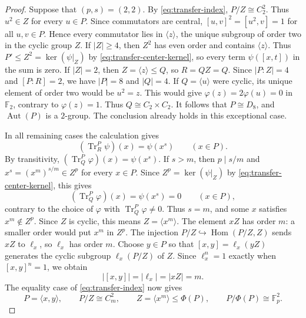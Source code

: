 \documentclass[11pt,a4paper]{article}
\theoremstyle{definition}
\theoremstyle{remark}
\numberwithin{equation}{section}
\newcommand{\Fp}{\mathbb{F}_p}
\DeclareMathOperator{\Aut}{Aut}
\DeclareMathOperator{\Hom}{Hom}
\begin{document}
\begin{proof}
		Suppose that $(p,s)=(2,2)$.
		By \eqref{eq:transfer-index}, $P/Z\cong C_2^2$.
		Thus $u^2\in Z$ for every $u\in P$. Since commutators are central,
		$[u,v]^2=[u^2,v]=1$ for all $u,v\in P$. Hence every commutator lies in
		$\langle z\rangle$, the unique subgroup of order two in the cyclic group $Z$.
		If $|Z|\ge4$, then $Z^2$ has even order and contains $\langle z\rangle$.
		Thus $P'\le Z^2=\ker(\psi|_Z)$ by \eqref{eq:transfer-center-kernel},
		so every term $\psi([x,t])$ in the sum is zero.
		If $|Z|=2$, then $Z=\langle z\rangle\le Q$, so $R=QZ=Q$.
		Since $|P:Z|=4$ and $[P:R]=2$, we have $|P|=8$ and $|Q|=4$.
		If $Q=\langle u\rangle$ were cyclic, its unique element of order two
		would be $u^2=z$. This would give $\varphi(z)=2\varphi(u)=0$ in $\mathbb F_2$,
		contrary to $\varphi(z)=1$. Thus $Q\cong C_2\times C_2$.
		It follows that $P\cong D_8$, and $\Aut(P)$ is a
		$2$-group.  The conclusion already holds in this exceptional case.
		
		In all remaining cases the calculation gives
		\begin{equation}\label{eq:transfer-power}
			(\operatorname{Tr}_R^P\psi)(x)=\psi(x^s)\qquad(x\in P).
		\end{equation}
		By transitivity,
		$(\operatorname{Tr}_{Q}^P\varphi)(x)=\psi(x^s)$.
		If $s>m$, then $p\mid s/m$ and $x^s=(x^m)^{s/m}\in Z^p$ for every $x\in P$.
		Since $Z^p=\ker(\psi|_Z)$ by \eqref{eq:transfer-center-kernel}, this gives
		\[
		(\operatorname{Tr}_{Q}^P\varphi)(x)=\psi(x^s)=0\qquad(x\in P),
		\]
		contrary to the choice of $\varphi$ with $\operatorname{Tr}_{Q}^P\varphi\ne0$.
		Thus $s=m$, and some $x$ satisfies $x^m\notin Z^p$.
		Since $Z$ is cyclic, this means $Z=\langle x^m\rangle$.
		The element $xZ$ has order $m$: a smaller order would put $x^m$
		in $Z^p$.
		The injection $P/Z\hookrightarrow\Hom(P/Z,Z)$ sends $xZ$ to $\ell_x$,
		so $\ell_x$ has order $m$. Choose $y\in P$ so that
		$[x,y]=\ell_x(yZ)$ generates the cyclic subgroup $\ell_x(P/Z)$ of $Z$.
		Since $\ell_x^n=1$ exactly when $[x,y]^n=1$, we obtain
		\begin{equation}\label{eq:transfer-commutator-order}
			|[x,y]|=|\ell_x|=|xZ|=m.
		\end{equation}
		The equality case of \eqref{eq:transfer-index} now gives
		\[
		P=\langle x,y\rangle,\qquad P/Z\cong C_m^2,\qquad
		Z=\langle x^m\rangle\le\Phi(P),\qquad
		P/\Phi(P)\cong\Fp^2.
		\]
		

\end{proof}
\end{document}
